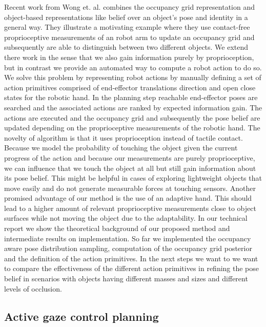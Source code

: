 \documentclass[a4paper,11pt,pdf]{../templates/pacmanreport}
\begin{document}
Recent work from Wong et. al. \cite{Lawson2016Not} combines the occupancy grid representation and object-based representations like belief over an object's pose and identity 
in a general way. They illustrate a motivating example where they use contact-free proprioceptive measurements of an robot arm to update an 
occupancy grid and subsequently are able to distinguish between two different objects. 
We extend there work in the sense that we also gain information purely by proprioception, but in contrast we provide an automated way to compute 
a robot action to do so.
We  solve this problem by representing robot actions by manually defining a set of action primitives comprised of end-effector translations direction and
open close states for the robotic hand. In the planning step reachable end-effector poses are searched and the associated actions are ranked 
by expected information gain.
The actions are executed and the occupancy grid and subsequently the pose belief are updated depending on the proprioceptive measurements of the robotic hand.
The novelty of algorithm is that it uses proprioception instead of tactile contact. Because we model the probability of touching the object 
given the current progress of the action and because our measurements are purely proprioceptive, we can influence that we touch the object at all but still 
gain information about its pose belief. This might be helpful in cases of exploring lightweight objects that move easily and do not 
generate measurable forces at touching sensors.
Another promised advantage of our method is the use of an adaptive hand. This should lead to a higher amount of 
relevant proprioceptive measurements close to object surfaces while not moving the object due to the adaptability.
In our technical report we show the theoretical background of our proposed method and intermediate results on implementation. 
So far we implemented the occupancy aware pose distribution sampling, computation of the occupancy grid posterior and the definition of the action primitives.
In the next steps we want to we want to compare the effectiveness of the different action primitives in refining the pose belief in scenarios with objects 
having different masses and sizes and different levels of occlusion. 

\subsection{Active gaze control planning}
\end{document}
